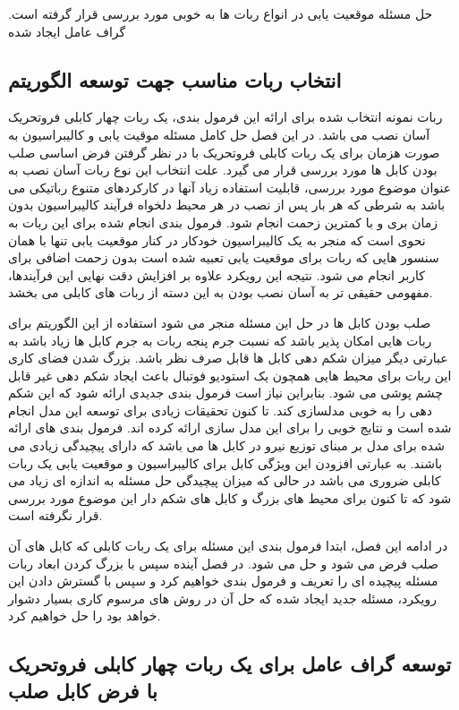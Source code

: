 حل مسئله موقعیت یابی در انواع ربات ها به خوبی مورد بررسی قرار گرفته است. گراف عامل ایجاد شده 





\subsection{انتخاب ربات مناسب جهت توسعه  الگوریتم}
ربات نمونه انتخاب شده برای ارائه این فرمول بندی، یک ربات چهار کابلی فروتحریک آسان نصب می باشد. در این فصل حل کامل مسئله موقیت یابی و کالیبراسیون به صورت هزمان برای یک ربات کابلی فروتحریک با در نظر گرفتن فرض اساسی صلب بودن کابل ها مورد بررسی قرار می گیرد. علت انتخاب این نوع ربات آسان نصب به عنوان موضوع مورد بررسی، قابلیت استفاده زیاد آنها در کارکردهای متنوع رباتیکی می باشد به شرطی که هر بار پس از نصب در هر محیط دلخواه فرآیند کالیبراسیون بدون زمان بری و با کمترین زحمت انجام شود. فرمول بندی انجام شده برای این ربات به نحوی است که منجر به یک کالیبراسیون خودکار در کنار موقعیت یابی تنها با همان سنسور هایی که ربات برای موقعیت یابی تعبیه شده است بدون زحمت اضافی برای کاربر انجام می شود. نتیجه این رویکرد علاوه بر افزایش دقت نهایی این فرآیندها، مفهومی حقیقی تر به آسان نصب بودن به این دسته از ربات های کابلی می بخشد. 

صلب بودن کابل ها در حل این مسئله منجر می شود استفاده از این الگوریتم برای ربات هایی امکان پذیر باشد که نسبت جرم پنجه ربات به جرم کابل ها زیاد باشد به عبارتی دیگر میزان شکم دهی کابل ها قابل صرف نظر باشد. بزرگ شدن فضای کاری این ربات برای محیط هایی همچون یک استودیو فوتبال باعث ایجاد شکم دهی غیر قابل چشم پوشی می شود. بنابراین نیاز است فرمول بندی جدیدی ارائه شود که این شکم دهی را به خوبی مدلسازی کند. تا کنون تحقیقات زیادی برای توسعه این مدل انجام شده است و نتایج خوبی را برای این مدل سازی ارائه کرده اند. فرمول بندی های ارائه شده برای مدل بر مبنای توزیع نیرو در کابل ها می باشد که دارای پیچیدگی زیادی می باشند. به عبارتی افزودن این ویژگی کابل برای کالیبراسیون و موقعیت یابی یک ربات کابلی ضروری می باشد در حالی که میزان پیچیدگی حل مسئله به اندازه ای زیاد می شود که تا کنون برای محیط های بزرگ و کابل های شکم دار این موضوع مورد بررسی قرار نگرفته است. 

در ادامه این فصل، ابتدا فرمول بندی این مسئله برای یک ربات کابلی که کابل های آن صلب فرض می شود و حل می شود. در فصل آینده سپس با بزرگ کردن ابعاد ربات مسئله پیچیده ای را تعریف و فرمول بندی خواهیم کرد و سپس با گسترش دادن این رویکرد، مسئله جدید ایجاد شده که حل آن در روش های مرسوم کاری بسیار دشوار خواهد بود را حل خواهیم کرد. 
 

\subsection{توسعه گراف عامل برای یک ربات چهار کابلی فروتحریک با فرض کابل صلب}
 
 
 
 
 
 
 
 
 
 
 
 
 